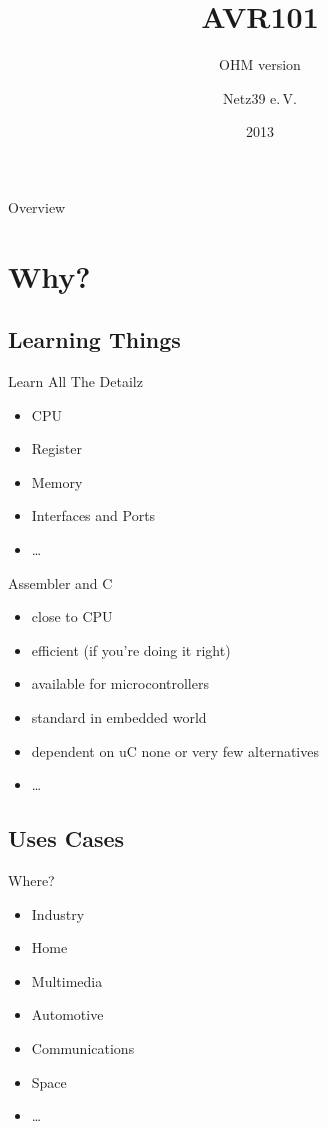 \documentclass{beamer}
\title{AVR101}
\subtitle{OHM version}
\author{Netz39 e.\,V.}
\institute{\url{http://www.netz39.de/}}
\date{2013}
\begin{document}
\begin{frame}
	\titlepage
\end{frame}

\begin{frame}{Overview}
    \tableofcontents
\end{frame}

\section{Why?}

\subsection{Learning Things}

\begin{frame}{Learn All The Detailz}
    \begin{itemize}
        \item CPU
        \item Register
        \item Memory
        \item Interfaces and Ports
        \item \dots
    \end{itemize}
\end{frame}

\begin{frame}{Assembler and C}
    \begin{itemize}
        \item close to CPU
        \item efficient (if you're doing it right)
        \item available for microcontrollers
        \item standard in embedded world
        \item dependent on uC none or very few alternatives
        \item \dots
    \end{itemize}
\end{frame}

\subsection{Uses Cases}

\begin{frame}{Where?}
    \begin{itemize}
        \item Industry
        \item Home
        \item Multimedia
        \item Automotive
        \item Communications
        \item Space
        \item …
    \end{itemize}
\end{frame}
\end{document}
